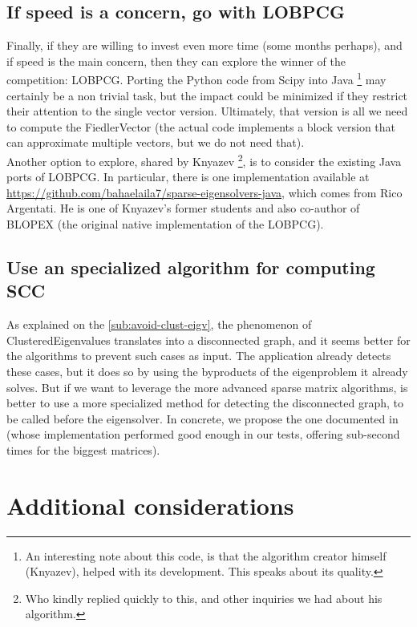\subsection{If speed is a concern, go with \gls{LOBPCG}}

Finally, if they are willing to invest even more time (some months
perhaps),  and if speed is the
main concern, then they can explore the winner of the competition:
\gls{LOBPCG}. Porting the Python code from Scipy into Java \footnote{An
  interesting note about this code, is that the algorithm creator
  himself (Knyazev), helped with its development. This speaks about
  its quality.} may certainly be a non trivial task, but the impact
could be minimized if they restrict their attention to the single
vector version. Ultimately, that version is all we need to compute the
\gls{FiedlerVector} (the   
actual code implements a block version that can approximate multiple
vectors, but we do not need that). \\

Another option to explore, shared by Knyazev \footnote{Who kindly
  replied quickly to this, and other inquiries we had about his
  algorithm.}, is to consider the existing Java ports of
\gls{LOBPCG}. In particular, there is one implementation
available at
\url{https://github.com/bahaelaila7/sparse-eigensolvers-java}, which
comes from Rico Argentati. He is one of Knyazev's former students and also
co-author of BLOPEX \cite{blopex} (the original native
implementation of the \gls{LOBPCG}).

\subsection{Use an specialized algorithm for computing SCC}

As explained on the \cref{sub:avoid-clust-eigv}, the phenomenon of
\gls{ClusteredEigenvalues} translates into a disconnected graph, and
it seems better for the algorithms to prevent such cases as input. The
application already detects these cases, but it does so by using the
byproducts of the eigenproblem it already solves. But if we want to
leverage the more advanced sparse matrix algorithms, is better to use
a more specialized method for detecting the disconnected graph, to
be called before the eigensolver. In
concrete, we propose the one documented in \cite{pearce05} (whose
implementation performed good enough in our tests, offering sub-second
times for the biggest matrices). 

\section{Additional considerations}

